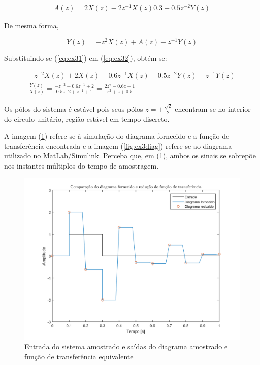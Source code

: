 \documentclass{article}
\begin{document}
\begin{equation}
\begin{split}
\label{eq:ex31}
A(z) = 2 X(z) - 2 z^{-1} X(z) 0.3 - 0.5 z^{-2} Y(z)
\end{split}
\end{equation}

De mesma forma,

\begin{equation}
\label{eq:ex32}
Y(z) = -z^2 X(z) + A(z) - z^{-1} Y(z)
\end{equation}

Substituindo-se (\ref{eq:ex31}) em (\ref{eq:ex32}), obtém-se:

\begin{equation}
\begin{split}
-z^{-2} X(z) + 2 X(z) - 0.6  z^{-1} X(z) - 0.5 z^{-2} Y(z) - z^{-1} Y(z) \\
\frac{Y(z)}{X(z)} = \frac{- z^{-2} - 0.6 z^{-1} + 2}{0.5 z^-2 + z^{-1} + 1} = \frac{2 z^{2} - 0.6 z - 1}{z^2 + z + 0.5}
\end{split}
\end{equation}

Os pólos do sistema é estável pois seus pólos $z = \pm\frac{\sqrt{2}}{2}$ encontram-se no interior do circulo unitário, região estável em tempo discreto.

A imagem (\ref{fig:ex3sim}) refere-se à simulação do diagrama fornecido e a função de transferência encontrada e a imagem (\ref{fig:ex3diag}) refere-se ao diagrama utilizado no MatLab/Simulink. Perceba que, em (\ref{fig:ex3sim}), ambos os sinais se sobrepõe nos instantes múltiplos do tempo de amostragem. 

\begin{figure}[!h]
	\center
	\includegraphics[width=\textwidth]{./images/ex31.png}
	\caption{Entrada do sistema amostrado e saídas do diagrama amostrado e função de transferência equivalente}
	\label{fig:ex3sim}
\end{figure}
\end{document}
